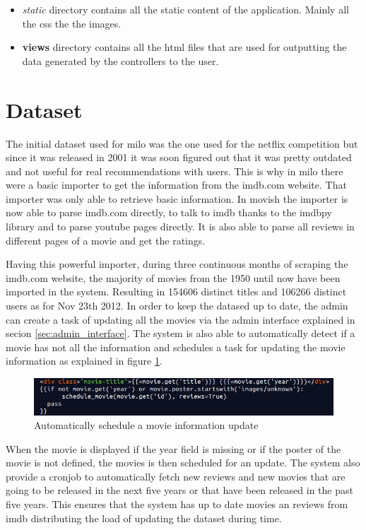 \begin{itemize}
\item \textit{static} directory contains all the static content of the application. Mainly all the css the the images.
\item \textbf{views} directory contains all the html files that are used for outputting the data generated by the controllers to the user.
\end{itemize}

\section{Dataset}
\label{sec:dataset}

The initial dataset used for milo was the one used for the netflix competition \cite{netflixprize} but since it was released in 2001 it was soon figured out that it was pretty outdated and not useful for real recommendations with users. This is why in milo there were a basic importer to get the information from the imdb.com website. That importer was only able to retrieve basic information. In movish the importer is now able to parse imdb.com directly, to talk to imdb thanks to the imdbpy \cite{imdbpy} library and to parse youtube pages directly. It is also able to parse all reviews in different pages of a movie and get the ratings.

Having this powerful importer, during three continuous months of scraping the imdb.com website, the majority of movies from the 1950 until now have been imported in the system. Resulting in 154606 distinct titles and 106266 distinct users as for Nov 23th 2012. In order to keep the datased up to date, the admin can create a task of updating all the movies via the admin interface explained in secion \ref{sec:admin_interface}. The system is also able to automatically detect if a movie has not all the information and schedules a task for updating the movie information as explained in figure \ref{fig:movie_update}.

\begin{figure}
  \centering
  \includegraphics[width=\textwidth]{figures/auto_update_movie.png}
  \caption{Automatically schedule a movie information update}
  \label{fig:movie_update}
\end{figure}

When the movie is displayed if the year field is missing or if the poster of the movie is not defined, the movies is then scheduled for an update. The system also provide a cronjob to automatically fetch new reviews and new movies that are going to be released in the next five years or that have been released in the past five years. This ensures that the system has up to date movies an reviews from imdb distributing the load of updating the dataset during time.


